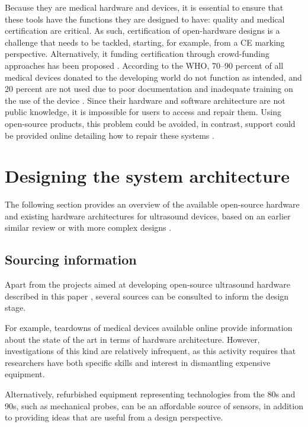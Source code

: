 \documentclass{article}
\begin{document}
Because they are medical hardware and devices, it is essential to ensure that these tools have the functions they are designed to have: quality and medical certification are critical. As such, certification of open-hardware designs is a challenge that needs to be tackled, starting, for example, from a CE marking perspective. Alternatively, it funding certification through crowd-funding approaches has been proposed \cite{de_maria_safe_2018}. According to the WHO, 70–90 percent of all medical devices donated to the developing world do not function as intended, and 20 percent are not used due to poor documentation and inadequate training on the use of the device \cite{niezen_open-source_2016}. Since their hardware and software architecture are not public knowledge, it is impossible for users to access and repair them. Using open-source products, this problem could be avoided, in contrast, support could be provided online detailing how to repair these systems \cite{gibney_open-hardware_2016}.

\newpage
\section{Designing the system architecture}

The following section provides an overview of the available open-source hardware and existing hardware architectures for ultrasound devices, based on an earlier similar review \cite{jonveaux_arduino-like_2017} or with more complex designs \cite{roman_open-source_2019}.


\subsection{Sourcing information}

Apart from the projects aimed at developing open-source ultrasound hardware described in this paper  \cite{roman_open-source_2019, luc_jonveaux_un0rick_2019}, several sources can be consulted to inform the design stage.  

For example, teardowns of medical devices available online provide information about the state of the art in terms of hardware architecture. However, investigations of this kind are relatively infrequent, as this activity requires that researchers have both specific skills and interest in dismantling expensive equipment.

Alternatively, refurbished equipment representing technologies from the 80s and 90s, such as mechanical probes, can be an affordable source of sensors, in addition to providing ideas that are useful from a design perspective.  
\end{document}
